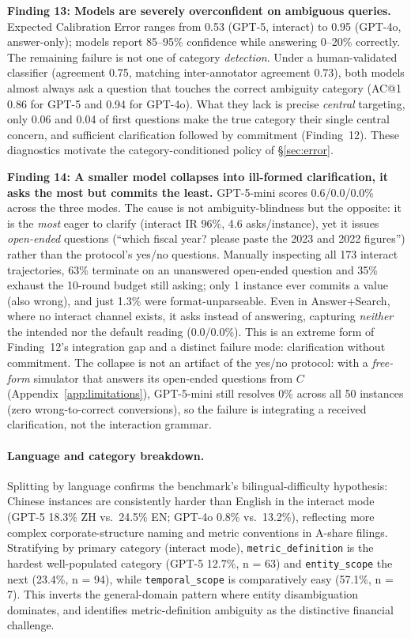 \textbf{Finding 13: Models are severely overconfident on ambiguous queries.}
Expected Calibration Error ranges from 0.53 (GPT-5, interact) to 0.95 (GPT-4o,
answer-only); models report 85--95\% confidence while answering 0--20\%
correctly. The remaining failure is not one of category \emph{detection}. Under a
human-validated classifier (agreement 0.75, matching inter-annotator agreement 0.73),
both models almost always ask a question that touches the correct ambiguity category (AC@1
0.86 for GPT-5 and 0.94 for GPT-4o). What they lack is precise \emph{central} targeting,
only 0.06 and 0.04 of first questions make the true category their single central concern,
and sufficient clarification followed by commitment (Finding~12). These diagnostics motivate the category-conditioned policy of
\S\ref{sec:error}.

\textbf{Finding 14: A smaller model collapses into ill-formed clarification, 
it asks the most but commits the least.} GPT-5-mini scores 0.6/0.0/0.0\% across
the three modes. The cause is not ambiguity-blindness but the opposite: it is the
\emph{most} eager to clarify (interact IR 96\%, 4.6 asks/instance), yet it
issues \emph{open-ended} questions (``which fiscal year? please paste the 2023 and
2022 figures'') rather than the protocol's yes/no questions. Manually inspecting
all 173 interact trajectories, 63\% terminate on an unanswered open-ended
question and 35\% exhaust the 10-round budget still asking; only 1 instance
ever commits a value (also wrong), and just 1.3\% were format-unparseable. Even
in Answer+Search, where no interact channel exists, it asks instead of
answering, capturing \emph{neither} the intended nor the default reading
(0.0/0.0\%). This is an extreme form of Finding~12's integration gap and a
distinct failure mode: clarification without commitment. The collapse is not an
artifact of the yes/no protocol: with a \emph{free-form} simulator that answers its
open-ended questions from $C$ (Appendix~\ref{app:limitations}), GPT-5-mini still resolves
0\% across all 50 instances (zero wrong-to-correct conversions), so the failure
is integrating a received clarification, not the interaction grammar.

\paragraph{Language and category breakdown.} Splitting by language confirms the
benchmark's bilingual-difficulty hypothesis: Chinese instances are consistently
harder than English in the interact mode (GPT-5 18.3\% ZH vs.\ 24.5\% EN;
GPT-4o 0.8\% vs.\ 13.2\%), reflecting more complex corporate-structure naming
and metric conventions in A-share filings. Stratifying by primary category (interact
mode), \texttt{metric\_definition} is the hardest well-populated category (GPT-5
12.7\%, n = 63) and \texttt{entity\_scope} the next (23.4\%, n = 94),
while \texttt{temporal\_scope} is comparatively easy (57.1\%, n = 7). This
inverts the general-domain pattern where entity disambiguation dominates, and
identifies metric-definition ambiguity as the distinctive financial challenge.

